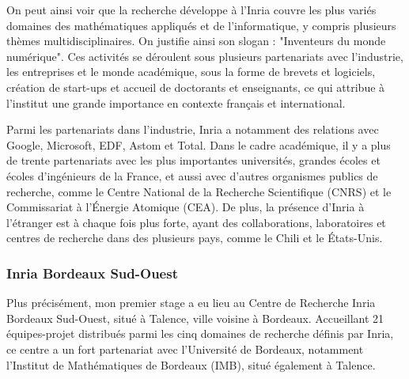 \indent On peut ainsi voir que la recherche développe à l'Inria couvre les plus variés domaines des mathématiques appliqués et de l'informatique, y compris plusieurs thèmes multidisciplinaires. On justifie ainsi son slogan : "Inventeurs du monde numérique". Ces activités se déroulent sous plusieurs partenariats avec l'industrie, les entreprises et le monde académique, sous la forme de brevets et logiciels, création de start-ups et accueil de doctorants et enseignants, ce qui attribue à l'institut une grande importance en contexte français et international.

\indent Parmi les partenariats dans l'industrie, Inria a notamment des relations avec Google, Microsoft, EDF, Astom et Total. Dans le cadre académique, il y a plus de trente partenariats avec les plus importantes universités, grandes écoles et écoles d'ingénieurs de la France, et aussi avec d'autres organismes publics de recherche, comme le Centre National de la Recherche Scientifique (CNRS) et le Commissariat à l'Énergie Atomique (CEA). De plus, la présence d'Inria à l'étranger est à chaque fois plus forte, ayant des collaborations, laboratoires et centres de recherche dans des plusieurs pays, comme le Chili et le États-Unis.


\subsubsection{Inria Bordeaux Sud-Ouest}

\indent Plus précisément, mon premier stage a eu lieu au Centre de Recherche Inria Bordeaux Sud-Ouest, situé à Talence, ville voisine à Bordeaux. Accueillant 21 équipes-projet distribués parmi les cinq domaines de recherche définis par Inria, ce centre a un fort partenariat avec l'Université de Bordeaux, notamment l'Institut de Mathématiques de Bordeaux (IMB), situé également à Talence.

